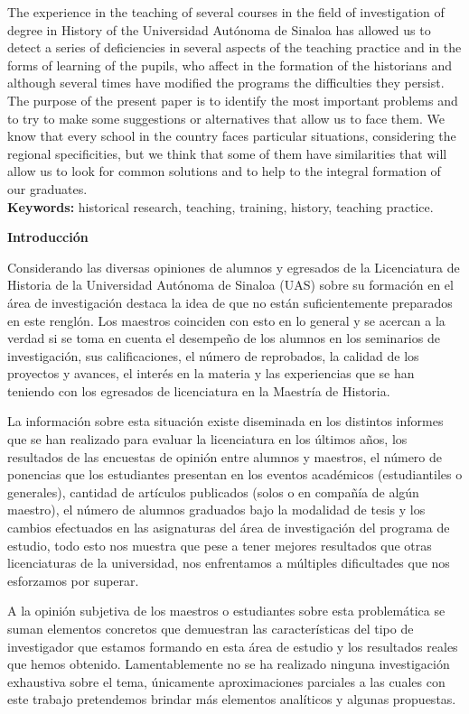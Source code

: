 The experience in the teaching of several courses in the field of 
investigation of degree in History of the Universidad Autónoma de 
Sinaloa has allowed us to detect a series of deficiencies in several 
aspects of the teaching practice and in the forms of learning of the 
pupils, who affect in the formation of the historians and although 
several times have modified the programs the difficulties they persist. 
The purpose of the present paper is to identify the most important 
problems and to try to make some suggestions or alternatives that allow 
us to face them. We know that every school in the country faces 
particular situations, considering the regional specificities, but we 
think that some of them have similarities that will allow us to look 
for common solutions and to help to the integral formation of our 
graduates.\\
\textbf{Keywords:} historical research, teaching, training, history, 
teaching practice.


\medskip
{\bfseries Introducción}
\enlargethispage{1\baselineskip}

Considerando las diversas opiniones de alumnos y egresados de la 
Licenciatura de Historia de la Universidad Autónoma de Sinaloa (UAS) 
sobre su formación en el área de investigación destaca la idea de que 
no están suficientemente preparados en este renglón. Los maestros 
coinciden con esto en lo general y se acercan a la verdad si se toma en 
cuenta el desempeño de los alumnos en los seminarios de investigación, 
sus calificaciones, el número de reprobados, la calidad de los 
proyectos y avances, el interés en la materia y las experiencias que se 
han teniendo con los egresados de licenciatura en la Maestría de 
Historia.

La información sobre esta situación existe diseminada en los distintos 
informes que se han realizado para evaluar la licenciatura en los 
últimos años, los resultados de las encuestas de opinión entre alumnos 
y maestros, el número de ponencias que los estudiantes presentan en los 
eventos académicos (estudiantiles o generales), cantidad de artículos 
publicados (solos o en compañía de algún maestro), el número de alumnos 
graduados bajo la modalidad de tesis y los cambios efectuados en las 
asignaturas del área de investigación del programa de estudio, todo 
esto nos muestra que pese a tener mejores resultados que otras 
licenciaturas de la universidad, nos enfrentamos a múltiples 
dificultades que nos esforzamos por superar.

A la opinión subjetiva de los maestros o estudiantes sobre esta 
problemática se suman elementos concretos que demuestran las 
características del tipo de investigador que estamos formando en esta 
área de estudio y los resultados reales que hemos obtenido. 
Lamentablemente no se ha realizado ninguna investigación exhaustiva 
sobre el tema, únicamente aproximaciones parciales a las cuales con 
este trabajo pretendemos brindar más elementos analíticos y algunas 
propuestas.

